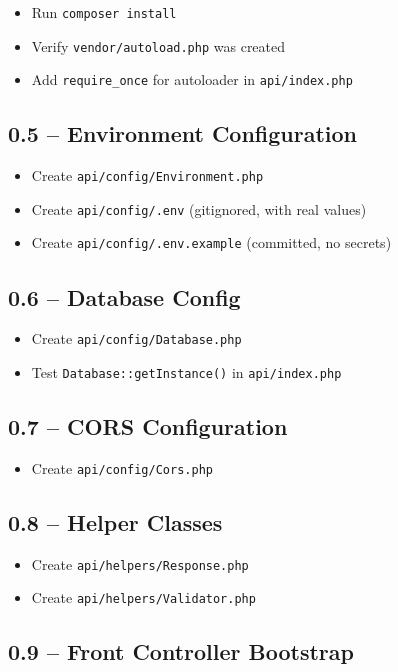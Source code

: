 \documentclass[11pt,a4paper]{article}
\newcommand{\undone}{\textcolor{helixgray}{\texttt{[ ] }}}
\newcommand{\done}{\textcolor{helixteal}{\textbf{[x] }}}
\newcommand{\filepath}[1]{\texttt{\small#1}}
\newcommand{\task}[2]{\item[#1] #2}
\begin{document}
\begin{itemize}
    \task{\done}{Run \texttt{composer install}}
    \task{\done}{Verify \filepath{vendor/autoload.php} was created}
    \task{\undone}{Add \texttt{require\_once} for autoloader in \filepath{api/index.php}}
\end{itemize}

\subsection{0.5 -- Environment Configuration}

\begin{itemize}
    \task{\done}{Create \filepath{api/config/Environment.php}}
    \task{\done}{Create \filepath{api/config/.env} (gitignored, with real values)}
    \task{\done}{Create \filepath{api/config/.env.example} (committed, no secrets)}
\end{itemize}

\subsection{0.6 -- Database Config}

\begin{itemize}
    \task{\done}{Create \filepath{api/config/Database.php}}
    \task{\undone}{Test \texttt{Database::getInstance()} in \filepath{api/index.php}}
\end{itemize}

\subsection{0.7 -- CORS Configuration}

\begin{itemize}
    \task{\done}{Create \filepath{api/config/Cors.php}}
\end{itemize}

\subsection{0.8 -- Helper Classes}

\begin{itemize}
    \task{\undone}{Create \filepath{api/helpers/Response.php}}
    \task{\undone}{Create \filepath{api/helpers/Validator.php}}
\end{itemize}

\subsection{0.9 -- Front Controller Bootstrap}
\end{document}
